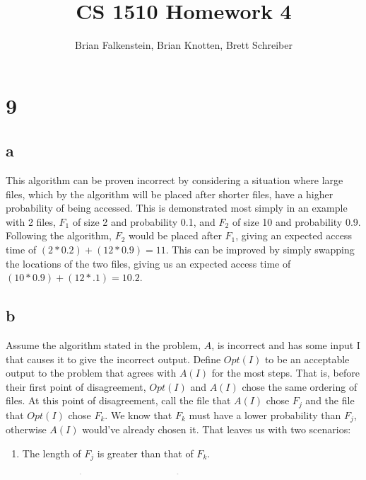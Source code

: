\documentclass[letterpaper,notitlepage,twoside]{article}
\title{CS 1510 Homework 4}
\author{Brian Falkenstein, Brian Knotten, Brett Schreiber}
\begin{document}
\maketitle

\section*{9}
\subsection*{a}
This algorithm can be proven incorrect by considering a situation where large files, which by the algorithm will be placed after shorter files, have a higher probability of being accessed. This is demonstrated most simply in an example with 2 files, $F_1$ of size 2 and probability 0.1, and $F_2$ of size 10 and probability 0.9. Following the algorithm, $F_2$ would be placed after $F_1$, giving an expected access time of $(2*0.2)+(12*0.9)=11$. This can be improved by simply swapping the locations of the two files, giving us an expected access time of $(10*0.9)+(12*.1)=10.2$.
\subsection*{b}
Assume the algorithm stated in the problem, $A$, is incorrect and has some input I that causes it to give the incorrect output. Define $Opt(I)$ to be an acceptable output to the problem that agrees with $A(I)$ for the most steps. That is, before their first point of disagreement, $Opt(I)$ and $A(I)$ chose the same ordering of files. At this point of disagreement, call the file that $A(I)$ chose $F_j$ and the file that $Opt(I)$ chose $F_k$. We know that $F_k$ must have a lower probability than $F_j$, otherwise $A(I)$ would've already chosen it. That leaves us with two scenarios:
\begin{enumerate}
\item The length of $F_j$ is greater than that of $F_k$.
\item The length of $F_j$ is less than that of $F_k$. 
\end{enumerate}
Both situations bring us to a contradiction of $Opt(I)$ being an acceptable output. Having the larger probability file come before the lower probability one always results in a more optimal solution, as the probability for a specific file will always stay the same no matter where it is placed in the chain, but the length of files before the file, and thus the value multiplied by the probability at that step in the calculation of expected access time, varies. The highest probability files should be placed at the start of the tape, so as to minimize the length of tape before these files that will need to be multiplied by their probabilities.Thus, $Opt(I)$ can be modified to agree with $A(I)$ for one more step by simply swapping $F_k$ with $F_j$, making $Opt(I)$ more optimal. 
\end{document}
